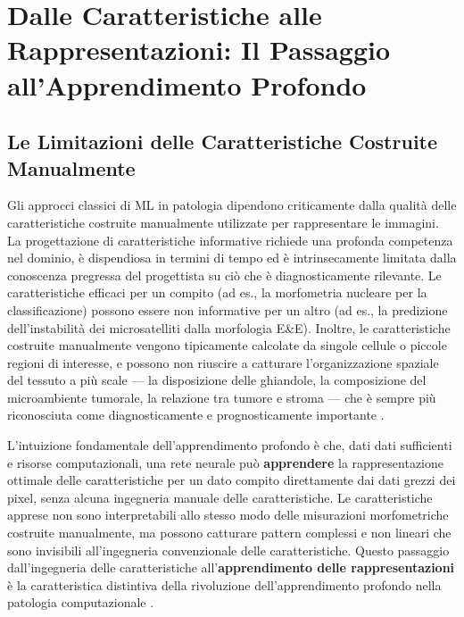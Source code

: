 \section{Dalle Caratteristiche alle Rappresentazioni: Il Passaggio all'Apprendimento Profondo}
\label{sec:ch3_deeplearning}

\subsection{Le Limitazioni delle Caratteristiche Costruite Manualmente}

Gli approcci classici di ML in patologia dipendono criticamente dalla qualità delle caratteristiche costruite manualmente utilizzate per rappresentare le immagini. La progettazione di caratteristiche informative richiede una profonda competenza nel dominio, è dispendiosa in termini di tempo ed è intrinsecamente limitata dalla conoscenza pregressa del progettista su ciò che è diagnosticamente rilevante. Le caratteristiche efficaci per un compito (ad es., la morfometria nucleare per la classificazione) possono essere non informative per un altro (ad es., la predizione dell'instabilità dei microsatelliti dalla morfologia E\&E). Inoltre, le caratteristiche costruite manualmente vengono tipicamente calcolate da singole cellule o piccole regioni di interesse, e possono non riuscire a catturare l'organizzazione spaziale del tessuto a più scale — la disposizione delle ghiandole, la composizione del microambiente tumorale, la relazione tra tumore e stroma — che è sempre più riconosciuta come diagnosticamente e prognosticamente importante \cite{bera2019}.

L'intuizione fondamentale dell'apprendimento profondo è che, dati dati sufficienti e risorse computazionali, una rete neurale può \textbf{apprendere} la rappresentazione ottimale delle caratteristiche per un dato compito direttamente dai dati grezzi dei pixel, senza alcuna ingegneria manuale delle caratteristiche. Le caratteristiche apprese non sono interpretabili allo stesso modo delle misurazioni morfometriche costruite manualmente, ma possono catturare pattern complessi e non lineari che sono invisibili all'ingegneria convenzionale delle caratteristiche. Questo passaggio dall'ingegneria delle caratteristiche all'\textbf{apprendimento delle rappresentazioni} è la caratteristica distintiva della rivoluzione dell'apprendimento profondo nella patologia computazionale \cite{song2023}.

